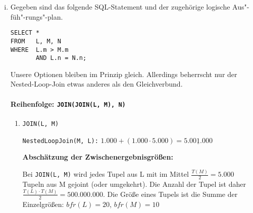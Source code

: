 \begin{enumerate}[a)]
\begin{enumerate}[i)]
\begin{solution}
\begin{enumerate}[1.]
		\end{enumerate}

\end{solution}

		\item Gegeben sind das folgende SQL-Statement und der zugehörige logische Aus"-füh"-rungs"-plan.

		\begin{minipage}{5.5cm}
		\begin{lstlisting}
SELECT *
FROM   L, M, N
WHERE  L.m > M.m
       AND L.n = N.n;
		\end{lstlisting}
		\end{minipage}
		\begin{minipage}{7cm}
		\end{minipage}

		\begin{solution}
		Unsere Optionen bleiben im Prinzip gleich.
		Allerdings beherrscht nur der Nested-Loop-Join etwas anderes als den Gleichverbund.

		\paragraph{\color{solutioncolor}Reihenfolge: \texttt{JOIN(JOIN(L, M), N)}}

		\begin{enumerate}[1.]

			\item \texttt{JOIN(L, M)}

			  \texttt{NestedLoopJoin(M, L):} $1.000 + (1.000 \cdot 5.000) = \underline{5.001.000}$

			  \textbf{Abschätzung der Zwischenergebnisgrößen:}

			  Bei \texttt{JOIN(L, M)} wird jedes Tupel aus L mit im Mittel $\frac{T(M)}{2} =5.000$ Tupeln aus M gejoint (oder umgekehrt).
			  Die Anzahl der Tupel ist daher $\frac{T(L) \cdot T(M)}{2}=500.000.000$.
			  Die Größe eines Tupels ist die Summe der Einzelgrößen: $bfr(L) = 20$, $bfr(M) = 10$


\end{enumerate}
\end{solution}
\end{enumerate}
\end{enumerate}
